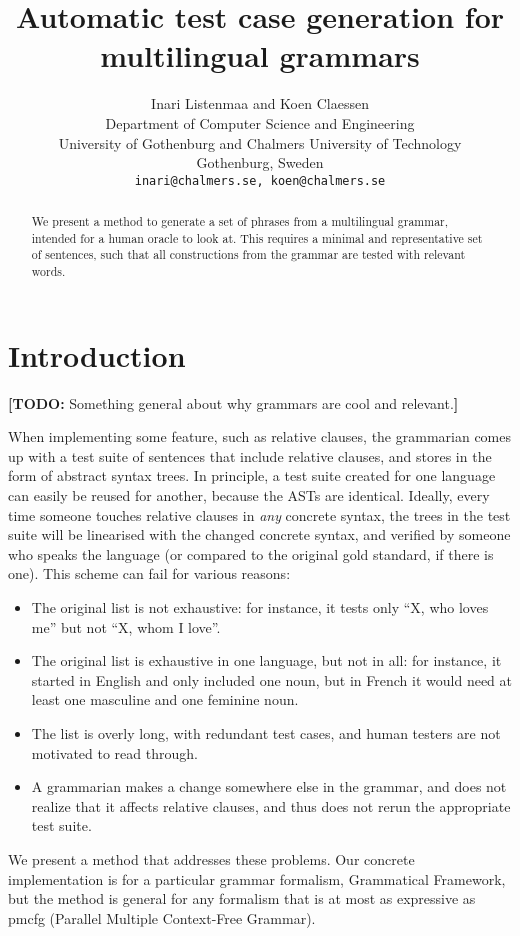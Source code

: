 \documentclass[11pt]{article}
\title{Automatic test case generation for multilingual grammars}
\author{Inari Listenmaa and Koen Claessen \\
  Department of Computer Science and Engineering \\
  University of Gothenburg and Chalmers University of Technology \\
  Gothenburg, Sweden \\
  {\tt inari@chalmers.se, koen@chalmers.se} }
\date{}
\newcommand{\todo}[1]{{\color{cyan}\textbf{[TODO: }#1\textbf{]}}}
\begin{document}
\maketitle
\begin{abstract}
  We present a method to generate a set of phrases from a multilingual
  grammar, intended for a human oracle to look at. This requires a
  minimal and representative set of sentences, such that all
  constructions from the grammar are tested with relevant words.
\end{abstract}

\section{Introduction}

\todo{Something general about why grammars are cool and relevant.}

When implementing some feature, such as 
relative clauses, the grammarian comes up with a test suite of 
sentences that include relative clauses, and stores in the form of 
abstract syntax trees. In principle, a test suite created for one 
language can easily be reused for another, because the ASTs are 
identical. Ideally, every time someone touches relative clauses 
in \emph{any} concrete syntax, the trees in the test suite will be 
linearised with the changed concrete syntax, and verified by someone
who speaks the language (or compared to the original gold standard, 
if there is one). This scheme can fail for various reasons: 

\begin{itemize}
\item The original list is not exhaustive: for instance, it tests only
``X, who loves me'' but not ``X, whom I love''. 
\item The original list is exhaustive in one language, but not in all:
for instance, it started in English and only included one noun, but in
French it would need at least one masculine and one feminine noun. 
\item The list is overly long, with redundant test cases, and human
testers are not motivated to read through. 
\item A grammarian makes a change somewhere else in the grammar, and
does not realize that it affects relative clauses, and thus does not
rerun the appropriate test suite. 
\end{itemize}

We present a method that addresses these problems. Our concrete
implementation is for a particular grammar formalism, Grammatical
Framework, but the method is general for any formalism that is at most
as expressive as {\sc pmcfg} (Parallel Multiple Context-Free Grammar).
\end{document}
